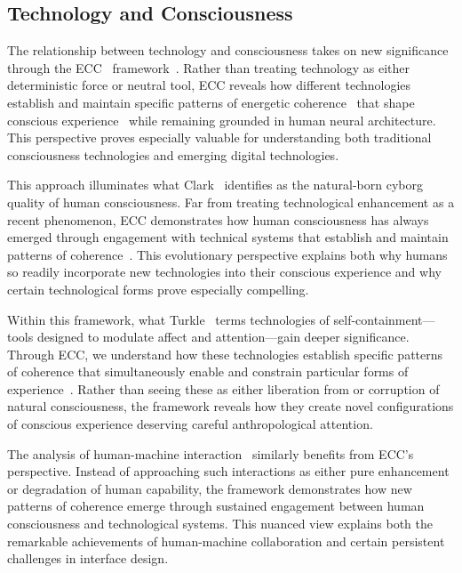 \subsection*{Technology and Consciousness}

The relationship between technology and consciousness takes on new significance through the ECC~ framework~\cite{hayles2012how,hayles2017unthought}. Rather than treating technology as either deterministic force or neutral tool, ECC reveals how different technologies establish and maintain specific patterns of energetic coherence~ that shape conscious experience~ while remaining grounded in human neural architecture. This perspective proves especially valuable for understanding both traditional consciousness technologies and emerging digital technologies.

This approach illuminates what Clark~\cite{clark2003natural} identifies as the natural-born cyborg quality of human consciousness. Far from treating technological enhancement as a recent phenomenon, ECC demonstrates how human consciousness has always emerged through engagement with technical systems that establish and maintain patterns of coherence~\cite{haraway1991simians,simondon2017mode}. This evolutionary perspective explains both why humans so readily incorporate new technologies into their conscious experience and why certain technological forms prove especially compelling.

Within this framework, what Turkle~\cite{turkle2011alone} terms technologies of self-containment—tools designed to modulate affect and attention—gain deeper significance. Through ECC, we understand how these technologies establish specific patterns of coherence that simultaneously enable and constrain particular forms of experience~\cite{horst2012digital}. Rather than seeing these as either liberation from or corruption of natural consciousness, the framework reveals how they create novel configurations of conscious experience deserving careful anthropological attention.

The analysis of human-machine interaction~\cite{mindell2015our,suchman2007human} similarly benefits from ECC's perspective. Instead of approaching such interactions as either pure enhancement or degradation of human capability, the framework demonstrates how new patterns of coherence emerge through sustained engagement between human consciousness and technological systems. This nuanced view explains both the remarkable achievements of human-machine collaboration and certain persistent challenges in interface design.

